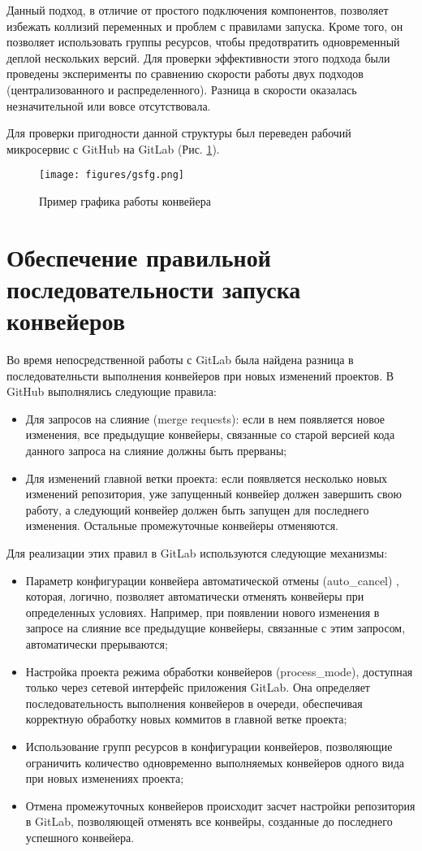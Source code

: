 Данный подход, в отличие от простого подключения компонентов, позволяет избежать коллизий переменных и проблем с правилами запуска. Кроме того, он позволяет использовать группы ресурсов, чтобы предотвратить одновременный деплой нескольких версий. Для проверки эффективности этого подхода были проведены эксперименты по сравнению скорости работы двух подходов (централизованного и распределенного). Разница в скорости оказалась незначительной или вовсе отсутствовала.

Для проверки пригодности данной структуры был переведен рабочий микросервис с GitHub на GitLab (Рис. \ref{1}).

\begin{figure}[H]
  \centering
  \texttt{[image: figures/gsfg.png]}
  \caption{Пример графика работы конвейера}
  \label{1}
\end{figure}

\section{Обеспечение правильной последовательности запуска конвейеров}
Во время непосредственной работы с GitLab была найдена разница в последователньсти выполнения конвейеров при новых изменений проектов. В GitHub выполнялись следующие правила:
\begin{itemize}
  \item Для  запросов на слияние (merge requests): если в нем появляется новое изменения, все предыдущие конвейеры, связанные со старой версией кода данного запроса на слияние должны быть прерваны;
  \item Для изменений главной ветки проекта: если появляется несколько новых изменений репозитория, уже запущенный конвейер должен завершить свою работу, а следующий конвейер должен быть запущен для последнего изменения. Остальные промежуточные конвейеры отменяются.
\end{itemize}

Для реализации этих правил в GitLab используются следующие механизмы:
\begin{itemize}
  \item Параметр конфигурации конвейера автоматической отмены (auto\_cancel) , которая, логично, позволяет автоматически отменять конвейеры при определенных условиях. Например, при появлении нового изменения в запросе на слияние все предыдущие конвейеры, связанные с этим запросом, автоматически прерываются;
  \item Настройка проекта режима обработки конвейеров (process\_mode), доступная только через сетевой интерфейс приложения GitLab. Она определяет последовательность выполнения конвейеров в очереди, обеспечивая корректную обработку новых коммитов в главной ветке проекта;
  \item Использование групп ресурсов в конфигурации конвейеров, позволяющие ограничить количество одновременно выполняемых конвейеров одного вида при новых изменениях проекта;
  \item Отмена промежуточных конвейеров происходит засчет настройки репозитория в GitLab, позволяющей отменять все конвейры, созданные до последнего успешного конвейера.
\end{itemize}

